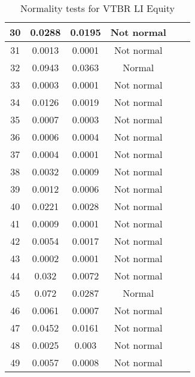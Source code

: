\begin{table}[h]
\begin{tabular}{|c|c|c|c|c|c|}
		30 & 0.0288 & 0.0195 & Not normal\\\hline
		31 & 0.0013 & 0.0001 & Not normal\\\hline
		32 & 0.0943 & 0.0363 & Normal\\\hline
		33 & 0.0003 & 0.0001 & Not normal\\\hline
		34 & 0.0126 & 0.0019 & Not normal\\\hline
		35 & 0.0007 & 0.0003 & Not normal\\\hline
		36 & 0.0006 & 0.0004 & Not normal\\\hline
		37 & 0.0004 & 0.0001 & Not normal\\\hline
		38 & 0.0032 & 0.0009 & Not normal\\\hline
		39 & 0.0012 & 0.0006 & Not normal\\\hline
		40 & 0.0221 & 0.0028 & Not normal\\\hline
		41 & 0.0009 & 0.0001 & Not normal\\\hline
		42 & 0.0054 & 0.0017 & Not normal\\\hline
		43 & 0.0002 & 0.0001 & Not normal\\\hline
		44 & 0.032 & 0.0072 & Not normal\\\hline
		45 & 0.072 & 0.0287 & Normal\\\hline
		46 & 0.0061 & 0.0007 & Not normal\\\hline
		47 & 0.0452 & 0.0161 & Not normal\\\hline
		48 & 0.0025 & 0.003 & Not normal\\\hline
		49 & 0.0057 & 0.0008 & Not normal\\\hline
	\end{tabular}
	\caption{Normality tests for VTBR LI Equity}
	\label{tab:normality_tests_VTBR_LI}
\end{table}

